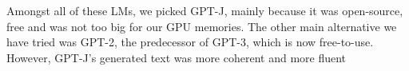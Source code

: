 Amongst all of these LMs, we picked GPT-J, mainly because it was open-source, free and was not too big for our GPU memories. The other main alternative we have tried was GPT-2, the predecessor of GPT-3, which is now free-to-use. However, GPT-J's generated text was more coherent and more fluent \\



